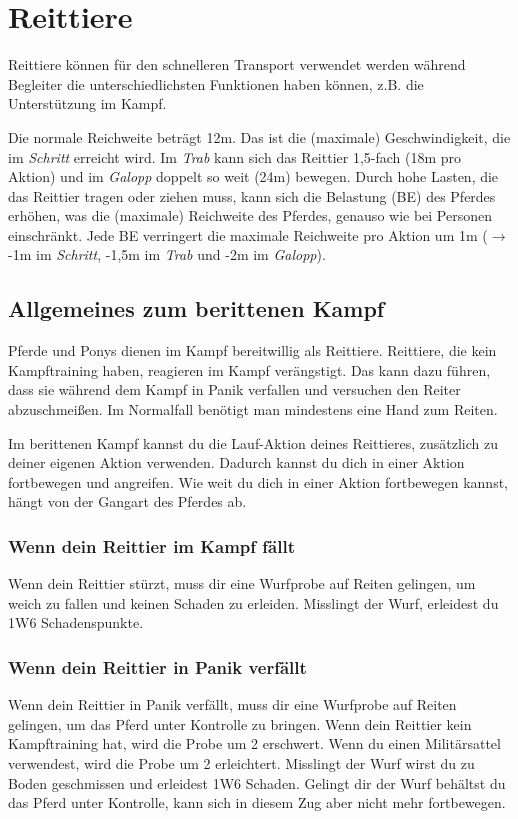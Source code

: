{\let\clearpage\relax\chapter{Reittiere}}
Reittiere können für den schnelleren Transport verwendet werden während Begleiter die unterschiedlichsten Funktionen haben können, z.B. die Unterstützung im Kampf.

Die normale Reichweite beträgt 12m. Das ist die (maximale) Geschwindigkeit, die im \textit{Schritt} erreicht wird. Im \textit{Trab} kann sich das Reittier 1,5-fach (18m pro Aktion) und im \textit{Galopp} doppelt so weit (24m) bewegen. Durch hohe Lasten, die das Reittier tragen oder ziehen muss, kann sich die Belastung (BE) des Pferdes erhöhen, was die (maximale) Reichweite des Pferdes, genauso wie bei Personen einschränkt. Jede BE verringert die maximale Reichweite pro Aktion um 1m ($\rightarrow$ -1m im \textit{Schritt}, -1,5m im \textit{Trab} und -2m im \textit{Galopp}).

\section{Allgemeines zum berittenen Kampf}
Pferde und Ponys dienen im Kampf bereitwillig als Reittiere. Reittiere, die kein Kampftraining haben, reagieren im Kampf verängstigt. Das kann dazu führen, dass sie während dem Kampf in Panik verfallen und versuchen den Reiter abzuschmeißen. Im Normalfall benötigt man mindestens eine Hand zum Reiten. 

Im berittenen Kampf kannst du die Lauf-Aktion deines Reittieres, zusätzlich zu deiner eigenen Aktion verwenden. Dadurch kannst du dich in einer Aktion fortbewegen und angreifen. Wie weit du dich in einer Aktion fortbewegen kannst, hängt von der Gangart des Pferdes ab. 

\subsection{Wenn dein Reittier im Kampf fällt} 
Wenn dein Reittier stürzt, muss dir eine Wurfprobe auf Reiten gelingen, um weich zu fallen und keinen Schaden zu erleiden. Misslingt der Wurf, erleidest du 1W6 Schadenspunkte.

\subsection{Wenn dein Reittier in Panik verfällt} Wenn dein Reittier in Panik verfällt, muss dir eine Wurfprobe auf Reiten gelingen, um das Pferd unter Kontrolle zu bringen. Wenn dein Reittier kein Kampftraining hat, wird die Probe um 2 erschwert. Wenn du einen Militärsattel verwendest, wird die Probe um 2 erleichtert. Misslingt der Wurf wirst du zu Boden geschmissen und erleidest 1W6 Schaden. Gelingt dir der Wurf behältst du das Pferd unter Kontrolle, kann sich in diesem Zug aber nicht mehr fortbewegen.

